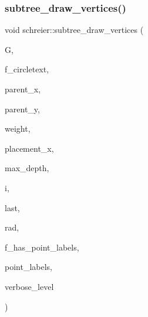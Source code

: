 \subsubsection{\texorpdfstring{subtree\+\_\+draw\+\_\+vertices()}{subtree\_draw\_vertices()}}
{\footnotesize\ttfamily void schreier\+::subtree\+\_\+draw\+\_\+vertices (\begin{DoxyParamCaption}\item[{\mbox{\hyperlink{classmp__graphics}{mp\+\_\+graphics}} \&}]{G,  }\item[{\mbox{\hyperlink{galois_8h_a09fddde158a3a20bd2dcadb609de11dc}{I\+NT}}}]{f\+\_\+circletext,  }\item[{\mbox{\hyperlink{galois_8h_a09fddde158a3a20bd2dcadb609de11dc}{I\+NT}}}]{parent\+\_\+x,  }\item[{\mbox{\hyperlink{galois_8h_a09fddde158a3a20bd2dcadb609de11dc}{I\+NT}}}]{parent\+\_\+y,  }\item[{\mbox{\hyperlink{galois_8h_a09fddde158a3a20bd2dcadb609de11dc}{I\+NT}} $\ast$}]{weight,  }\item[{\mbox{\hyperlink{galois_8h_a09fddde158a3a20bd2dcadb609de11dc}{I\+NT}} $\ast$}]{placement\+\_\+x,  }\item[{\mbox{\hyperlink{galois_8h_a09fddde158a3a20bd2dcadb609de11dc}{I\+NT}}}]{max\+\_\+depth,  }\item[{\mbox{\hyperlink{galois_8h_a09fddde158a3a20bd2dcadb609de11dc}{I\+NT}}}]{i,  }\item[{\mbox{\hyperlink{galois_8h_a09fddde158a3a20bd2dcadb609de11dc}{I\+NT}}}]{last,  }\item[{\mbox{\hyperlink{galois_8h_a09fddde158a3a20bd2dcadb609de11dc}{I\+NT}}}]{rad,  }\item[{\mbox{\hyperlink{galois_8h_a09fddde158a3a20bd2dcadb609de11dc}{I\+NT}}}]{f\+\_\+has\+\_\+point\+\_\+labels,  }\item[{\mbox{\hyperlink{galois_8h_a09fddde158a3a20bd2dcadb609de11dc}{I\+NT}} $\ast$}]{point\+\_\+labels,  }\item[{\mbox{\hyperlink{galois_8h_a09fddde158a3a20bd2dcadb609de11dc}{I\+NT}}}]{verbose\+\_\+level }\end{DoxyParamCaption})}

\mbox{\label{classschreier_a329904a694d26f47e62ef2d3583c50d1}} 
